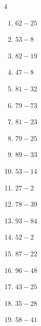 


\setcounter{quesnum}{120}

\begin{multicols}{4}
\begin{enumerate}
  \itemsep=5pt
  \item $62-25$
        \phantom{$=37$}

  \item $53-8$
        \phantom{$=45$}

  \item $82-19$
        \phantom{$=63$}

  \item $47-8$
        \phantom{$=39$}

  \item $81-32$
        \phantom{$=49$}

  \item $79-73$
        \phantom{$=6$}

  \item $81-23$
        \phantom{$=58$}

  \item $79-25$
        \phantom{$=54$}

  \item $89-33$
        \phantom{$=56$}

  \item $53-14$
        \phantom{$=39$}

  \item $27-2$
        \phantom{$=25$}

  \item $78-39$
        \phantom{$=39$}

  \item $93-84$
        \phantom{$=9$}

  \item $52-2$
        \phantom{$=50$}

  \item $87-22$
        \phantom{$=65$}

  \item $96-48$
        \phantom{$=48$}

  \item $43-25$
        \phantom{$=18$}

  \item $35-28$
        \phantom{$=7$}

  \item $58-41$
        \phantom{$=17$}


\end{enumerate}
\end{multicols}
